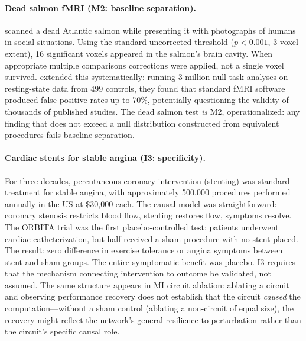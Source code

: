 \documentclass{article}
\begin{document}
\paragraph{Dead salmon fMRI (M2: baseline separation).}
\citet{bennett2010neural} scanned a dead Atlantic salmon while presenting it with photographs of humans in social situations. Using the standard uncorrected threshold ($p < 0.001$, 3-voxel extent), 16 significant voxels appeared in the salmon's brain cavity. When appropriate multiple comparisons corrections were applied, not a single voxel survived. \citet{eklund2016cluster} extended this systematically: running 3 million null-task analyses on resting-state data from 499 controls, they found that standard fMRI software produced false positive rates up to 70\%, potentially questioning the validity of thousands of published studies. The dead salmon test \emph{is} M2, operationalized: any finding that does not exceed a null distribution constructed from equivalent procedures fails baseline separation.

\paragraph{Cardiac stents for stable angina (I3: specificity).}
For three decades, percutaneous coronary intervention (stenting) was standard treatment for stable angina, with approximately 500,000 procedures performed annually in the US at \$30,000 each. The causal model was straightforward: coronary stenosis restricts blood flow, stenting restores flow, symptoms resolve. The ORBITA trial \citep{alhabib2018orbita} was the first placebo-controlled test: patients underwent cardiac catheterization, but half received a sham procedure with no stent placed. The result: zero difference in exercise tolerance or angina symptoms between stent and sham groups. The entire symptomatic benefit was placebo. I3 requires that the mechanism connecting intervention to outcome be validated, not assumed. The same structure appears in MI circuit ablation: ablating a circuit and observing performance recovery does not establish that the circuit \emph{caused} the computation---without a sham control (ablating a non-circuit of equal size), the recovery might reflect the network's general resilience to perturbation rather than the circuit's specific causal role.
\end{document}
